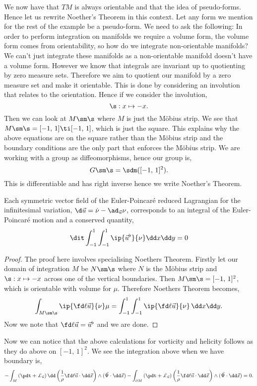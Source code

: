 \noindent
We now have that $TM$ is always orientable and that the idea of pseudo-forms. Hence let us rewrite Noether's Theorem in this context. Let any form we mention for the rest of the example be a pseudo-form. We need to ask the following: In order to perform integration on manifolds we require a volume form, the volume form comes from orientability, so how do we integrate non-orientable manifolds? We can't just integrate these manifolds as a non-orientable manifold doesn't have a volume form. However we know that integrals are invariant up to quotienting by zero measure sets. Therefore we aim to quotient our manifold by a zero measure set and make it orientable. This is done by considering an involution that relates to the orientation. Hence if we consider the involution,
$$ \s : x \mapsto -x. $$
Then we can look at $M \sm \s$ where $M$ is just the M\"obius strip. We see that $M\sm \s = [-1,\, 1] \ti [-1,\,1]$, which is just the square. This explains why the above equations are on the square rather than the M\"obius strip and the boundary conditions are the only part that enforces the M\"obius strip. We are working with a group as diffeomorphisms, hence our group is,
$$ G \sm \s = \sdm([-1,\,1]^2). $$
This is differentiable and has right inverse hence we write Noether's Theorem.
\begin{nthm}
  Each symmetric vector field of the Euler-Poincar\'e reduced Lagrangian for the infinitesimal variation, $\d \vec u = \dot\nu - \ad_{\vec u}\nu$, corresponds to an integral of the Euler-Poincar\'e motion and a conserved quantity,
  $$ \dit \int_{-1}^1 \int_{-1}^1 \ip{\vec u^\flat}{\nu} \dd x\dd y = 0 $$
\end{nthm}
\begin{proof}
  The proof here involves specialising Noethers Theorem. Firstly let our domain of integration $M$ be $N \sm \s$ where $N$ is the M\"obius strip and $\s : x \mapsto -x$ across one of the vertical boundaries. Then $M \sm \s = [-1,\,1]^2$, which is orientable with volume for $\mu$. Therefore Noethers Theorem becomes,
  $$ \int_{M\sm \s} \ip{\fd \ell {\vec u}}{\nu} \mu = \int_{-1}^1 \int_{-1}^1 \ip{\fd \ell {\vec u}}{\nu}\, \dd x \dd y. $$
  Now we note that $\fd \ell {\vec u} = \vec u^\flat$ and we are done.
\end{proof}
\noindent
Now we can notice that the above calculations for vorticity and helicity follows as they do above on $[-1,\,1]^2$. We see the integration above when we have boundary is,
$$ -\int_M \left( \pdt + \pounds_{\vec u}\right)\dd \left( \frac{1}{\rho} \fd \ell {\vec u}\cdot \dd \vec x \right) \wedge (\vec\Psi \cdot \dd \vec x) - \int_{\partial M}\left( \pdt + \pounds_{\vec u}\right) \left( \frac{1}{\rho} \fd \ell {\vec u}\cdot \dd \vec x \right) \wedge (\vec\Psi \cdot \dd \vec x) = 0. $$
